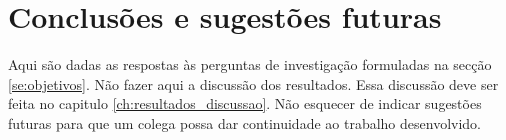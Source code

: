 \chapter{Conclusões e sugestões futuras}

Aqui são dadas as respostas às perguntas de investigação formuladas na secção \ref{se:objetivos}. Não fazer aqui a discussão dos resultados. Essa discussão deve ser feita no capitulo \ref{ch:resultados_discussao}. Não esquecer de indicar sugestões futuras para que um colega possa dar continuidade ao trabalho desenvolvido. 